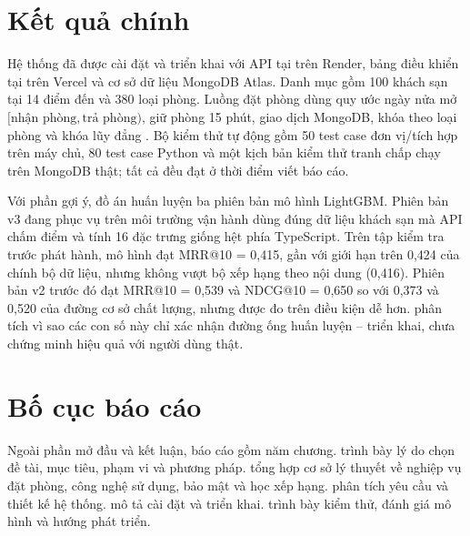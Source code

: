 \section*{Kết quả chính}

Hệ thống đã được cài đặt và triển khai với API tại  trên Render, bảng điều khiển tại  trên Vercel và cơ sở dữ liệu MongoDB Atlas. Danh mục gồm 100 khách sạn tại 14 điểm đến và 380 loại phòng. Luồng đặt phòng dùng quy ước ngày nửa mở $[\text{nhận phòng}, \text{trả phòng})$, giữ phòng 15 phút, giao dịch MongoDB, khóa theo loại phòng và khóa lũy đẳng . Bộ kiểm thử tự động gồm 50 test case đơn vị/tích hợp trên máy chủ, 80 test case Python và một kịch bản kiểm thử tranh chấp chạy trên MongoDB thật; tất cả đều đạt ở thời điểm viết báo cáo.

Với phần gợi ý, đồ án huấn luyện ba phiên bản mô hình LightGBM. Phiên bản v3 đang phục vụ trên môi trường vận hành dùng đúng dữ liệu khách sạn mà API chấm điểm và tính 16 đặc trưng giống hệt phía TypeScript. Trên tập kiểm tra trước phát hành, mô hình đạt MRR@10 = 0,415, gần với giới hạn trên 0,424 của chính bộ dữ liệu, nhưng không vượt bộ xếp hạng theo nội dung (0,416). Phiên bản v2 trước đó đạt MRR@10 = 0,539 và NDCG@10 = 0,650 so với 0,373 và 0,520 của đường cơ sở chất lượng, nhưng được đo trên điều kiện dễ hơn.  phân tích vì sao các con số này chỉ xác nhận đường ống huấn luyện -- triển khai, chưa chứng minh hiệu quả với người dùng thật.

\section*{Bố cục báo cáo}

Ngoài phần mở đầu và kết luận, báo cáo gồm năm chương.  trình bày lý do chọn đề tài, mục tiêu, phạm vi và phương pháp.  tổng hợp cơ sở lý thuyết về nghiệp vụ đặt phòng, công nghệ sử dụng, bảo mật và học xếp hạng.  phân tích yêu cầu và thiết kế hệ thống.  mô tả cài đặt và triển khai.  trình bày kiểm thử, đánh giá mô hình và hướng phát triển.
